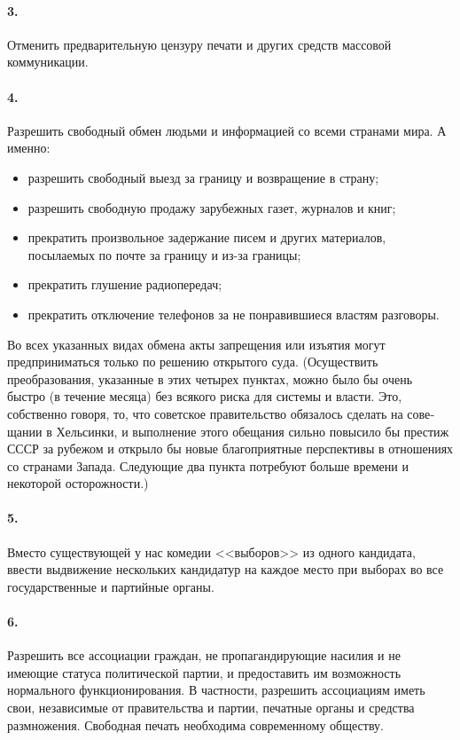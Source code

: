 \documentclass{book}
\begin{document}
\paragraph{3.} Отменить предварительную цензуру печати и других средств массовой коммуникации.

\paragraph{4.} Разрешить свободный обмен людьми и информацией со всеми странами мира. А именно:
\begin{itemize}
 \item разрешить свободный выезд за границу и возвращение в страну;
 \item разрешить свободную продажу зарубежных газет, журна­лов и книг;
 \item прекратить произвольное задержание писем и других ма­териалов, посылаемых по почте за границу и из-за границы;
 \item прекратить глушение радиопередач;
 \item прекратить отключение телефонов за не понравившиеся властям разговоры.
\end{itemize}

Во всех указанных видах обмена акты запрещения или изъя­тия могут предприниматься только по решению открытого су­да.
(Осуществить преобразования, указанные в этих четырех пунктах, можно было бы очень быстро (в течение месяца) без всякого риска для системы и власти. Это, собственно гово­ря, то, что советское правительство обязалось сделать на сове­щании в Хельсинки, и выполнение этого обещания сильно повы­сило бы престиж СССР за рубежом и открыло бы новые благо­приятные перспективы в отношениях со странами Запада. Сле­дующие два пункта потребуют больше времени и некоторой осторожности.)

\paragraph{5.} Вместо существующей у нас комедии <<выборов>> из одно­го кандидата, ввести выдвижение нескольких кандидатур на каждое место при выборах во все государственные и партий­ные органы.

\paragraph{6.} Разрешить все ассоциации граждан, не пропагандирующие насилия и не имеющие статуса политической партии, и предоста­вить им возможность нормального функционирования. В частно­сти, разрешить ассоциациям иметь свои, независимые от прави­тельства и партии, печатные органы и средства размножения. Свободная печать необходима современному обществу.
\end{document}
